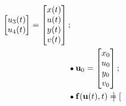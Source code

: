 \documentclass[../differential_methods.tex]{subfiles}
\begin{document}
\begin{example}[Gravitação]
\begin{align*}
\begin{bmatrix}
			                                                                                             u_{3}(t) \\
			                                                                                             u_{4}(t)
		                                                                                             \end{bmatrix} = \begin{bmatrix}
			                                                                                                             x(t) \\
			                                                                                                             u(t) \\
			                                                                                                             y(t) \\
			                                                                                                             v(t)
		                                                                                                             \end{bmatrix};                                                                                                                                              \\
		 & \tikz[baseline=-0.5ex]\draw[black, fill=black, radius=1.5pt](0, 0)circle;\; \mathbf{u}_{0}= \begin{bmatrix}
			                                                                                               x_{0} \\
			                                                                                               u_{0} \\
			                                                                                               y_{0} \\
			                                                                                               v_{0}
		                                                                                               \end{bmatrix};                                                                                                                                                            \\
		 & \tikz[baseline=-0.5ex]\draw[black, fill=black, radius=1.5pt](0, 0)circle;\; \mathbf{f}(\mathbf{u}(t), t) = \begin{bmatrix}

\end{bmatrix}
\end{align*}
\end{example}
\end{document}
